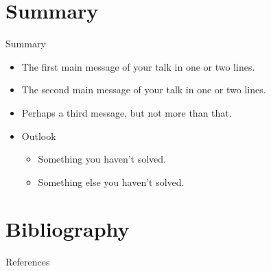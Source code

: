 \documentclass[xcolor=dvipsnames]{beamer}
\begin{document}
\section*{Summary}

\begin{frame}{Summary}
  \begin{itemize}
  \item
    The \alert{first main message} of your talk in one or two lines.
  \item
    The \alert{second main message} of your talk in one or two lines.
  \item
    Perhaps a \alert{third message}, but not more than that.
  \end{itemize}
  
  \begin{itemize}
  \item
    Outlook
    \begin{itemize}
    \item
      Something you haven't solved.
    \item
      Something else you haven't solved.
    \end{itemize}
  \end{itemize}
\end{frame}

\section*{Bibliography}
\begin{frame}[allowframebreaks]{References}
    \footnotesize
  
  
\end{frame}
\end{document}
